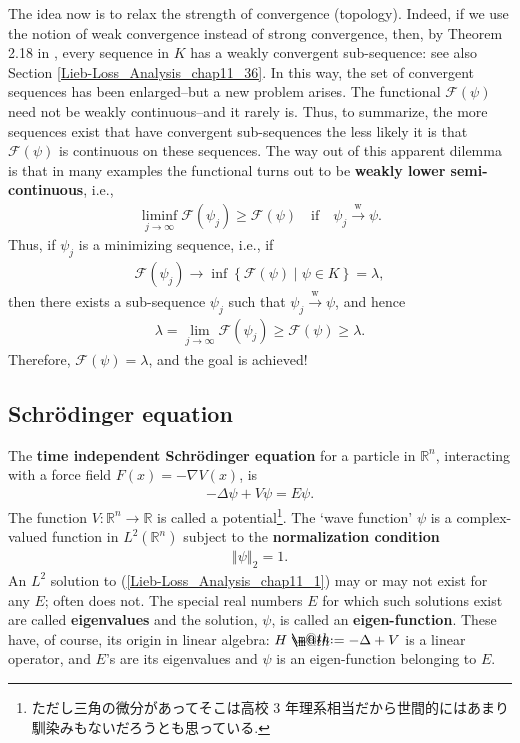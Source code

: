 \documentclass[openany, a4paper, oneside]{jsbook}
\makeatletter
\newcommand*{\defeq}{\mathrel{\rlap{%
\raisebox{0.3ex}{$\m@th\cdot$}}%
\raisebox{-0.3ex}{$\m@th\cdot$}}%
=}
\theoremstyle{break}
\theoremstyle{breakdefn}
\newcommand{\norm}[1]{\left\Vert#1\right\Vert}
\newcommand{\twonorm}[1]{\norm{#1}_2}
\newcommand{\rbk}[1]{\left (#1\right)}
\newcommand{\relmiddle}[1]{\mathrel{}\middle#1\mathrel{}}
\newcommand{\set}[2]{\left\{#1 \relmiddle| #2\right\}}
\newcommand{\bbR}{\mathbb{R}}
\newcommand{\calF}{\mathcal{F}}
\newcommand{\wto}{\xrightarrow{\text{w}}}
\makeatother
\begin{document}
The idea now is to relax the strength of convergence (topology).
Indeed, if we use the notion of weak convergence instead of strong convergence, then, by Theorem 2.18 in \cite{LiebLoss1},
every sequence in $K$ has a weakly convergent sub-sequence: see also Section \ref{Lieb-Loss_Analysis_chap11_36}.
In this way, the set of convergent sequences has been enlarged--but a new problem arises.
The functional $\calF (\psi)$ need not be weakly continuous--and it rarely is.
Thus, to summarize, the more sequences exist that have convergent sub-sequences the less likely it is that
$\calF (\psi)$ is continuous on these sequences.
The way out of this apparent dilemma is that in many examples the functional turns out to be \textbf{weakly lower semi-continuous}, i.e.,
\begin{align}
 \liminf_{j \to \infty} \calF \rbk{\psi_j} \geq \calF \rbk{\psi}
 \quad \text{if} \quad \psi_j \wto \psi.
\end{align}
Thus, if $\psi_j$ is a minimizing sequence, i.e., if
\begin{align}
 \calF \rbk{\psi_j} \to \inf \set{\calF \rbk{\psi}}{\psi \in K} = \lambda,
\end{align}
then there exists a sub-sequence $\psi_j$ such that $\psi_j \wto \psi$, and hence
\begin{align}
 \lambda
 =
 \lim_{j \to \infty} \calF \rbk{\psi_j} \geq \calF \rbk{\psi} \geq \lambda.
\end{align}
Therefore, $\calF \rbk{\psi} = \lambda$, and the goal is achieved!
\subsection{Schr\"odinger equation}


The \textbf{time independent Schr\"odinger equation} for a particle in $\bbR^n$, interacting with a force field $F (x) = - \nabla V (x)$, is
\begin{align}
 -\Delta \psi + V \psi = E \psi. \label{Lieb-Loss_Analysis_chap11_1}
\end{align}
The function $V \colon \bbR^n \to \bbR$ is called a potential\footnote{ただし三角の微分があってそこは高校 3 年理系相当だから世間的にはあまり馴染みもないだろうとも思っている.
 }.
The `wave function' $\psi$ is a complex-valued function in $L^2 (\bbR^n)$ subject to the \textbf{normalization condition}
\begin{align}
 \twonorm{\psi} = 1.
\end{align}
An $L^2$ solution to (\ref{Lieb-Loss_Analysis_chap11_1}) may or may not exist for any $E$; often does not.
The special real numbers $E$ for which such solutions exist are called \textbf{eigenvalues} and the solution,
$\psi$, is called an \textbf{eigen-function}.
These have, of course, its origin in linear algebra: $H \defeq - \Delta + V$ is a linear operator,
and $E$'s are its eigenvalues and $\psi$ is an eigen-function belonging to $E$.
\end{document}
